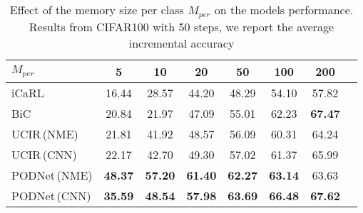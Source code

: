 \documentclass[runningheads]{llncs}
\begin{document}
\begin{table}[t]
\centering
\caption{Effect of the memory size per class $M_{per}$ on the models performance. Results from CIFAR100 with 50 steps, we report the average incremental accuracy}
\label{tab:ablation_memorysize}
\begin{tabular}{@{}lccccccc@{}}
 \toprule
 $M_{per}$ & 5     & 10    & \textbf{20}    & 50    & 100   & 200\\
 \midrule
iCaRL \cite{rebuffi2017icarl}      & 16.44 & 28.57 & 44.20 & 48.29 & 54.10 & 57.82\\
BiC \cite{wu2019bias_correction}       & 20.84  & 21.97  & 47.09  & 55.01  & 62.23  & \textbf{67.47}\\
UCIR\,{\scriptsize (NME)} \cite{hou2019ucir} & 21.81 & 41.92 & 48.57 & 56.09 & 60.31 & 64.24\\
UCIR\,{\scriptsize (CNN)} \cite{hou2019ucir} & 22.17 & 42.70 & 49.30 & 57.02 & 61.37 & 65.99\\
PODNet\,{\scriptsize (NME)}& \textbf{48.37} & \textbf{57.20} & \textbf{61.40} & \textbf{62.27} & \textbf{63.14} & 63.63\\
PODNet\,{\scriptsize (CNN)} & \textbf{35.59} & \textbf{48.54} & \textbf{57.98} & \textbf{63.69} & \textbf{66.48} & \textbf{67.62} \\
\bottomrule
\end{tabular}
\end{table}
\end{document}
